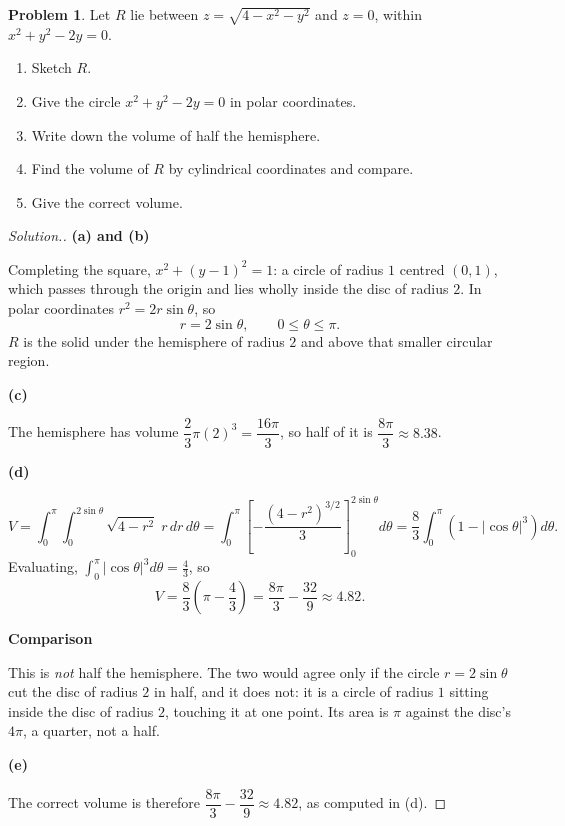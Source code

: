 \documentclass[11pt,a4paper]{article}
\theoremstyle{definition}
\newtheorem{problemx}{Problem}[subsection]
\newenvironment{problem}{\begin{problemx}}{\end{problemx}}
\newenvironment{solution}
  {\renewcommand{\qedsymbol}{}\begin{proof}[\textit{Solution}.]}
  {\end{proof}}
\newcommand{\subhead}[1]{%
  \par\medskip\noindent\textbf{#1}\par\nobreak\smallskip}
\begin{document}
\begin{problem}
Let $R$ lie between $z = \sqrt{4-x^2-y^2}$ and $z=0$, within
$x^2+y^2-2y = 0$.
\begin{enumerate}
\item[(a)] Sketch $R$.
\item[(b)] Give the circle $x^2+y^2-2y = 0$ in polar coordinates.
\item[(c)] Write down the volume of half the hemisphere.
\item[(d)] Find the volume of $R$ by cylindrical coordinates and compare.
\item[(e)] Give the correct volume.
\end{enumerate}
\end{problem}
\begin{solution}
\subhead{(a) and (b)}
Completing the square, $x^2+(y-1)^2 = 1$: a circle of radius $1$ centred
$(0,1)$, which passes through the origin and lies wholly inside the disc of
radius $2$. In polar coordinates $r^2 = 2r\sin\theta$, so
\[r = 2\sin\theta ,\qquad 0\leq\theta\leq\pi .\]
$R$ is the solid under the hemisphere of radius $2$ and above that smaller
circular region.

\subhead{(c)}
The hemisphere has volume $\dfrac23\pi(2)^3 = \dfrac{16\pi}{3}$, so half of it
is $\dfrac{8\pi}{3}\approx 8.38$.

\subhead{(d)}
\[V = \int_0^{\pi}\int_0^{2\sin\theta}\sqrt{4-r^2}\;r\,dr\,d\theta
= \int_0^{\pi}\left[-\frac{(4-r^2)^{3/2}}{3}\right]_0^{2\sin\theta}d\theta
= \frac{8}{3}\int_0^{\pi}(1-\left|\cos\theta\right|^3)d\theta .\]
Evaluating, $\displaystyle\int_0^{\pi}\left|\cos\theta\right|^3d\theta
= \frac43$, so
\[V = \frac83\left(\pi - \frac43\right) = \frac{8\pi}{3} - \frac{32}{9}
\approx 4.82 .\]

\subhead{Comparison}
This is \emph{not} half the hemisphere. The two would agree only if the circle
$r = 2\sin\theta$ cut the disc of radius $2$ in half, and it does not: it is a
circle of radius $1$ sitting inside the disc of radius $2$, touching it at one
point. Its area is $\pi$ against the disc's $4\pi$, a quarter, not a half.

\subhead{(e)}
The correct volume is therefore
$\dfrac{8\pi}{3}-\dfrac{32}{9}\approx 4.82$, as computed in (d).
\end{solution}
\end{document}
